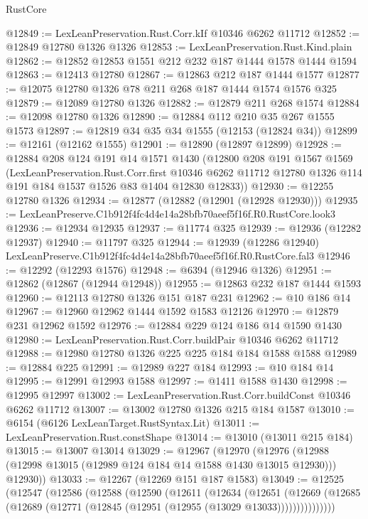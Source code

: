 \begin{lexlean}{RustCore}
\begin{coremodule}
@12849 := LexLeanPreservation.Rust.Corr.kIf @10346 @6262 @11712
@12852 := @12849 @12780 @1326 @1326
@12853 := LexLeanPreservation.Rust.Kind.plain
@12862 := @12852 @12853 @1551 @212 @232 @187 @1444 @1578 @1444 @1594
@12863 := @12413 @12780
@12867 := @12863 @212 @187 @1444 @1577
@12877 := @12075 @12780 @1326 @78 @211 @268 @187 @1444 @1574 @1576 @325
@12879 := @12089 @12780 @1326
@12882 := @12879 @211 @268 @1574
@12884 := @12098 @12780 @1326
@12890 := @12884 @112 @210 @35 @267 @1555 @1573
@12897 := @12819 @34 @35 @34 @1555 (@12153 (@12824 @34))
@12899 := @12161 (@12162 @1555)
@12901 := @12890 (@12897 @12899)
@12928 := @12884
    @208
    @124
    @191
    @14
    @1571
    @1430
    (@12800
      @208
      @191
      @1567
      @1569
      (LexLeanPreservation.Rust.Corr.first
        @10346
        @6262
        @11712
        @12780
        @1326
        @114
        @191
        @184
        @1537
        @1526
        @83
        @1404
        @12830
        @12833))
@12930 := @12255 @12780 @1326
@12934 := @12877 (@12882 (@12901 (@12928 @12930)))
@12935 := LexLeanPreserve.C1b912f4fc4d4e14a28bfb70aeef5f16f.R0.RustCore.look3
@12936 := @12934 @12935
@12937 := @11774 @325
@12939 := @12936 (@12282 @12937)
@12940 := @11797 @325
@12944 := @12939 (@12286 @12940) LexLeanPreserve.C1b912f4fc4d4e14a28bfb70aeef5f16f.R0.RustCore.fal3
@12946 := @12292 (@12293 @1576)
@12948 := @6394 (@12946 @1326)
@12951 := @12862 (@12867 (@12944 @12948))
@12955 := @12863 @232 @187 @1444 @1593
@12960 := @12113 @12780 @1326 @151 @187 @231
@12962 := @10 @186 @14
@12967 := @12960 @12962 @1444 @1592 @1583 @12126
@12970 := @12879 @231 @12962 @1592
@12976 := @12884 @229 @124 @186 @14 @1590 @1430
@12980 := LexLeanPreservation.Rust.Corr.buildPair @10346 @6262 @11712
@12988 := @12980 @12780 @1326 @225 @225 @184 @184 @1588 @1588
@12989 := @12884 @225
@12991 := @12989 @227 @184
@12993 := @10 @184 @14
@12995 := @12991 @12993 @1588
@12997 := @1411 @1588 @1430
@12998 := @12995 @12997
@13002 := LexLeanPreservation.Rust.Corr.buildConst @10346 @6262 @11712
@13007 := @13002 @12780 @1326 @215 @184 @1587
@13010 := @6154 (@6126 LexLeanTarget.RustSyntax.Lit)
@13011 := LexLeanPreservation.Rust.constShape
@13014 := @13010 (@13011 @215 @184)
@13015 := @13007 @13014
@13029 := @12967
    (@12970
      (@12976 (@12988 (@12998 @13015 (@12989 @124 @184 @14 @1588 @1430 @13015 @12930))) @12930))
@13033 := @12267 (@12269 @151 @187 @1583)
@13049 := @12525
    (@12547
      (@12586
        (@12588
          (@12590
            (@12611
              (@12634
                (@12651
                  (@12669
                    (@12685 (@12689 (@12771 (@12845 (@12951 (@12955 (@13029 @13033)))))))))))))))

\end{coremodule}
\end{lexlean}
